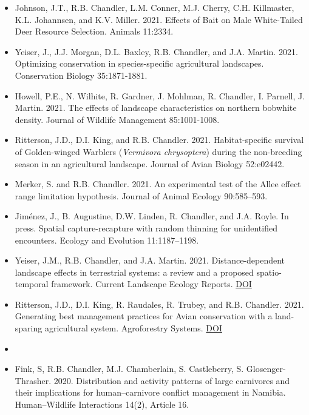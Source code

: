 \begin{itemize}
\item Johnson, J.T., R.B. Chandler, L.M. Conner, M.J. Cherry,
  C.H. Killmaster, K.L. Johannsen, and K.V. Miller. 2021. Effects of
  Bait on Male White-Tailed Deer Resource Selection. Animals 11:2334. 
  
\item Yeiser, J., J.J. Morgan, D.L. Baxley, R.B. Chandler, and
  J.A. Martin. 2021. Optimizing conservation in species-specific
  agricultural landscapes. Conservation Biology 35:1871-1881. 

\item Howell, P.E., N. Wilhite, R. Gardner, J. Mohlman, R. Chandler,
  I. Parnell, J. Martin. 2021. The effects of landscape
  characteristics on northern bobwhite density. Journal of Wildlife
  Management 85:1001-1008. 

\item Ritterson, J.D., D.I. King, and
  R.B. Chandler. 2021. Habitat-specific survival of Golden-winged
  Warblers ({\it Vermivora chrysoptera}) during the non-breeding
  season in an agricultural landscape. Journal of Avian Biology
  52:e02442.  
  
\item Merker, S. and R.B. Chandler. 2021. An experimental test of 
  the Allee effect range limitation hypothesis. Journal of Animal
  Ecology 90:585--593. 

\item Jim\'enez, J., B. Augustine, D.W. Linden, R. Chandler, and
  J.A. Royle. In press. Spatial capture-recapture with random thinning
  for unidentified encounters. Ecology and Evolution 11:1187--1198.

\item Yeiser, J.M., R.B. Chandler, and
  J.A. Martin. 2021. Distance-dependent landscape effects in
  terrestrial systems: a review and a proposed spatio-temporal
  framework. Current Landscape Ecology
  Reports. \href{https://doi.org/10.1007/s40823-020-00061-w}{DOI}

\item Ritterson, J.D., D.I. King, R. Raudales, R. Trubey, and
  R.B. Chandler. 2021. Generating best management practices for Avian
  conservation with a land-sparing agricultural system. Agroforestry
  Systems. \href{https://doi.org/10.1007/s10457-020-00582-7}{DOI}
  
  
\item[] { \\}

\item Fink, S, R.B. Chandler, M.J. Chamberlain, S. Castleberry,
  S. Glosenger-Thrasher. 2020. Distribution and activity patterns of 
  large carnivores and their implications for human–carnivore conflict 
  management in Namibia. Human–Wildlife Interactions 14(2), Article 16.    


\end{itemize}
